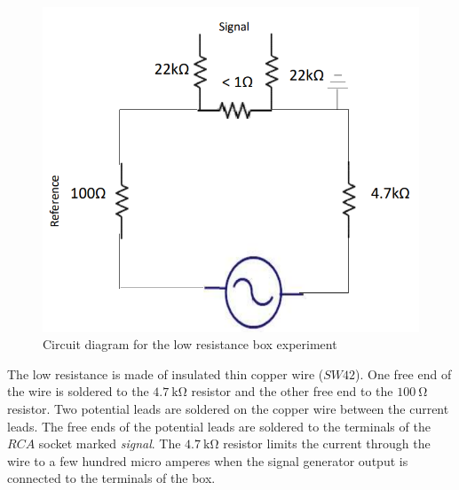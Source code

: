 \documentclass[%
 reprint,
nofootinbib,
 amsmath,amssymb,
 aps,
]{revtex4-2}
\begin{document}
            \begin{figure}
                \centering
                \includegraphics[scale = 0.6]{Figures/circuitlowres.png}
                \caption{Circuit diagram for the low resistance box experiment}
                \label{fig:circuit}
            \end{figure}
            \par
            The low resistance is made of insulated thin copper wire ($SW42$). One free end of the wire is soldered to the $\SI{4.7}{\kilo \ohm}$ resistor and the other free end to the $\SI{100}{\ohm}$ resistor. Two potential leads are soldered on the copper wire between the current leads. The free ends of the potential leads are soldered to the terminals of the $RCA$ socket marked \textit{signal}. The $\SI{4.7}{\kilo \ohm}$ resistor limits the current through the wire to a few hundred micro amperes when the signal generator output is connected to the terminals of the box.
\end{document}
